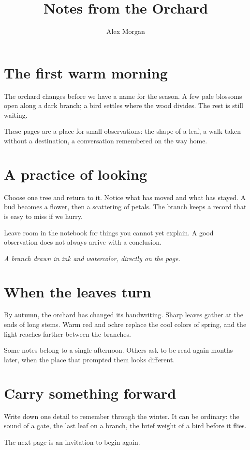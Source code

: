 \documentclass[11pt,a4paper,twoside]{article}
\title{Notes from the Orchard}
\author{Alex Morgan}
\date{}
\begin{document}
\maketitle
\section*{The first warm morning}
The orchard changes before we have a name for the season. A few pale blossoms open along a dark branch; a bird settles where the wood divides. The rest is still waiting.

These pages are a place for small observations: the shape of a leaf, a walk taken without a destination, a conversation remembered on the way home.
\section*{A practice of looking}
Choose one tree and return to it. Notice what has moved and what has stayed. A bud becomes a flower, then a scattering of petals. The branch keeps a record that is easy to miss if we hurry.

Leave room in the notebook for things you cannot yet explain. A good observation does not always arrive with a conclusion.
\begin{center}
\kachospray[width=0.85\linewidth,height=34mm,motif=ume,seed=14]
\end{center}
{\small\itshape A branch drawn in ink and watercolor, directly on the page.}
\clearpage
{}
\section*{When the leaves turn}
By autumn, the orchard has changed its handwriting. Sharp leaves gather at the ends of long stems. Warm red and ochre replace the cool colors of spring, and the light reaches farther between the branches.

Some notes belong to a single afternoon. Others ask to be read again months later, when the place that prompted them looks different.
\section*{Carry something forward}
Write down one detail to remember through the winter. It can be ordinary: the sound of a gate, the last leaf on a branch, the brief weight of a bird before it flies.

The next page is an invitation to begin again.
\end{document}
